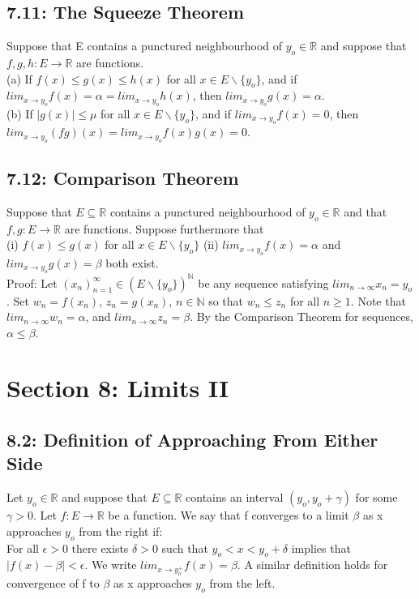 \documentclass[10pt,letter]{report}
\begin{document}
\section*{7.11: The Squeeze Theorem}
Suppose that E contains a punctured neighbourhood of $y_o\in\mathbb{R}$ and suppose that $f, g, h: E\rightarrow\mathbb{R}$ are functions. \\ 
(a) If $f(x)\leq g(x)\leq h(x)$ for all $x\in E\backslash\{y_o\}$, and if $lim_{x\rightarrow y_o}f(x) = \alpha = lim_{x\rightarrow y_o}h(x)$, then $lim_{x\rightarrow y_o}g(x) = \alpha$. \\ 
(b) If $|g(x)|\leq \mu$ for all $x \in E\backslash\{y_o\}$, and if $lim_{x\rightarrow y_o}f(x) = 0$, then $lim_{x\rightarrow y_o}(fg)(x) =lim_{x\rightarrow y_o}f(x)g(x) = 0$.

\section*{7.12: Comparison Theorem} 
Suppose that $E \subseteq \mathbb{R}$ contains a punctured neighbourhood of $y_o\in\mathbb{R}$ and that $f, g: E\rightarrow\mathbb{R}$ are functions. Suppose furthermore that \\ 
(i) $f(x)\leq g(x)$ for all $x\in E\backslash\{y_o\}$
(ii) $lim_{x\rightarrow y_o}f(x) = \alpha$ and $lim_{x\rightarrow y_o}g(x) = \beta$ both exist. \\ 
Proof: Let $(x_n)_{n=1}^\infty \in (E\backslash\{y_o\})^\mathbb{N}$ be any sequence satisfying $lim_{n\rightarrow\infty}x_n = y_o$. Set $w_n = f(x_n)$, $z_n = g(x_n)$, $n \in \mathbb{N}$ so that $w_n\leq z_n$ for all $n\geq 1$. Note that $lim_{n\rightarrow\infty}w_n = \alpha$, and $lim_{n\rightarrow\infty}z_n = \beta$. By the Comparison Theorem for sequences, $\alpha\leq\beta$. 



\chapter*{Section 8: Limits II}

\section*{8.2: Definition of Approaching From Either Side}
Let $y_o \in\mathbb{R}$ and suppose that $E \subseteq\mathbb{R}$ contains an interval $(y_o,y_o +\gamma)$ for some $\gamma>0$. Let $f: E\rightarrow\mathbb{R}$ be a function. We say that f converges to a limit $\beta$ as x approaches $y_o$ from the right if: \\ 
For all $\epsilon>0$ there exists $\delta>0$ such that $y_o<x<y_o+\delta$ implies that $|f(x)-\beta| < \epsilon$. We write $lim_{x\rightarrow y_o^+}f(x) = \beta$. A similar definition holds for convergence of f to $\beta$ as x approaches $y_o$ from the left. 
\end{document}

